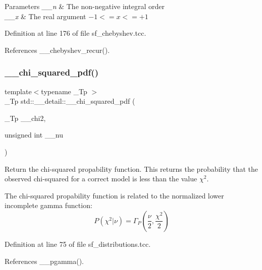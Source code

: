 \begin{DoxyParams}{Parameters}
{\em \+\_\+\+\_\+n} & The non-\/negative integral order \\
\hline
{\em \+\_\+\+\_\+x} & The real argument $ -1 <= x <= +1 $ \\
\hline
\end{DoxyParams}


Definition at line 176 of file sf\+\_\+chebyshev.\+tcc.



References \+\_\+\+\_\+chebyshev\+\_\+recur().

\mbox{\label{namespacestd_1_1____detail_a2125cbbc3fd3aad11c8025478c7a14fe}} 
\subsubsection{\texorpdfstring{\+\_\+\+\_\+chi\+\_\+squared\+\_\+pdf()}{\_\_chi\_squared\_pdf()}}
{\footnotesize\ttfamily template$<$typename \+\_\+\+Tp $>$ \\
\+\_\+\+Tp std\+::\+\_\+\+\_\+detail\+::\+\_\+\+\_\+chi\+\_\+squared\+\_\+pdf (\begin{DoxyParamCaption}\item[{\+\_\+\+Tp}]{\+\_\+\+\_\+chi2,  }\item[{unsigned int}]{\+\_\+\+\_\+nu }\end{DoxyParamCaption})}



Return the chi-\/squared propability function. This returns the probability that the observed chi-\/squared for a correct model is less than the value $ \chi^2 $. 

The chi-\/squared propability function is related to the normalized lower incomplete gamma function\+: \[ P(\chi^2|\nu) = \Gamma_P(\frac{\nu}{2}, \frac{\chi^2}{2}) \] 

Definition at line 75 of file sf\+\_\+distributions.\+tcc.



References \+\_\+\+\_\+pgamma().

\mbox{\label{namespacestd_1_1____detail_aa62c16dd75a7411400c7082e6b2b246b}} 
